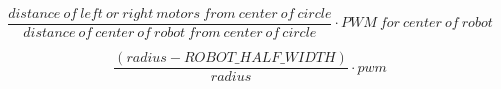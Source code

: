 \documentclass[10pt]{book}
\begin{document}
\begin{mdSnippets}
\begin{mdDisplaySnippet}[e8cafa34b9965bc9800090f872756b30]%
\begin{mdDiv}[class={mathdisplay,math-display},color={},math-needpdf={}]%
\[%
\frac{distance \ of \ left \ or \ right \ motors \ from \ center \ of \ circle}{distance \ of \ center \ of \ robot \ from \ center \ of \ circle} \cdot PWM \ for \ center \ of \ robot
\]%
\end{mdDiv}%

\end{mdDisplaySnippet}%
\begin{mdDisplaySnippet}%
\begin{mdDiv}[class={mathdisplay,math-display},color={},math-needpdf={}]%
\[%
\frac{(radius - ROBOT\_HALF\_WIDTH)} {radius} \cdot pwm
\]%
\end{mdDiv}%


\end{mdDisplaySnippet}
\end{mdSnippets}
\end{document}
